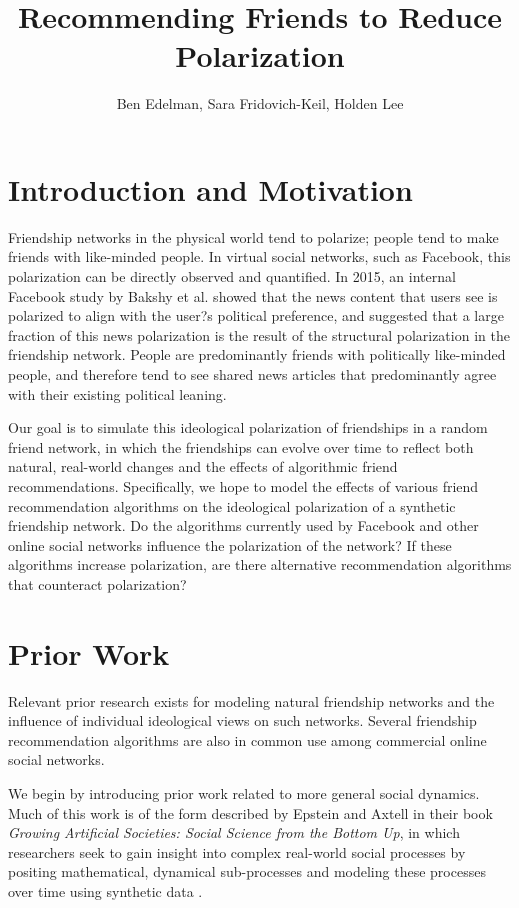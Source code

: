 \documentclass[12pt,letterpaper]{article}
\author{Ben Edelman, Sara Fridovich-Keil, Holden Lee}
\title{Recommending Friends to Reduce Polarization}
\begin{document}
\maketitle

\section{Introduction and Motivation}
Friendship networks in the physical world tend to polarize; people tend to make friends with like-minded people. In virtual social networks, such as Facebook, this polarization can be directly observed and quantified. In 2015, an internal Facebook study by Bakshy et al. \cite{bakshy} showed that the news content that users see is polarized to align with the user?s political preference, and suggested that a large fraction of this news polarization is the result of the structural polarization in the friendship network. People are predominantly friends with politically like-minded people, and therefore tend to see shared news articles that predominantly agree with their existing political leaning. 

Our goal is to simulate this ideological polarization of friendships in a random friend network, in which the friendships can evolve over time to reflect both natural, real-world changes and the effects of algorithmic friend recommendations. Specifically, we hope to model the effects of various friend recommendation algorithms on the ideological polarization of a synthetic friendship network. Do the algorithms currently used by Facebook and other online social networks influence the polarization of the network? If these algorithms increase polarization, are there alternative recommendation algorithms that counteract polarization? 


\section{Prior Work}

Relevant prior research exists for modeling natural friendship networks and the influence of individual ideological views on such networks. Several friendship recommendation algorithms are also in common use among commercial online social networks. 

We begin by introducing prior work related to more general social dynamics. Much of this work is of the form described by Epstein and Axtell in their book \textit{Growing Artificial Societies: Social Science from the Bottom Up}, in which researchers seek to gain insight into complex real-world social processes by positing mathematical, dynamical sub-processes and modeling these processes over time using synthetic data \cite{epstein}. 
\end{document}
